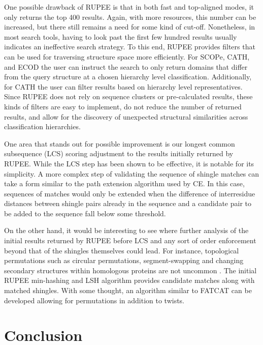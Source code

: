 \documentclass[10pt,letterpaper]{article}
\begin{document}
One possible drawback of RUPEE is that in both fast and top-aligned modes, it only returns the top 400 results. 
Again, with more resources, this number can be increased, but there still remains a need for some kind of cut-off. 
Nonetheless, in most search tools, having to look past the first few hundred results usually indicates an ineffective search strategy.
To this end, RUPEE provides filters that can be used for traversing structure space more efficiently. 
For SCOPe, CATH, and ECOD the user can instruct the search to only return domains that differ from the query structure at a chosen hierarchy level classification. 
Additionally, for CATH the user can filter results based on hierarchy level representatives. 
Since RUPEE does not rely on sequence clusters or pre-calculated results, these kinds of filters are easy to implement, do not reduce the number of returned results, and allow for the discovery of unexpected structural similarities across classification hierarchies.  

One area that stands out for possible improvement is our longest common subsequence (LCS) scoring adjustment to the results initially returned by RUPEE. 
While the LCS step has been shown to be effective, it is notable for its simplicity. 
A more complex step of validating the sequence of shingle matches can take a form similar to the path extension algorithm used by CE. 
In this case, sequences of matches would only be extended when the difference of interresidue distances between shingle pairs already in the sequence and a candidate pair to be added to the sequence fall below some threshold.

On the other hand, it would be interesting to see where further analysis of the initial results returned by RUPEE before LCS and any sort of order enforcement beyond that of the shingles themselves could lead. 
For instance, topological permutations such as circular permutations, segment-swapping and changing secondary structures within homologous proteins are not uncommon \cite{Andreeva2007}. 
The initial RUPEE min-hashing and LSH algorithm provides candidate matches along with matched shingles. 
With some thought, an algorithm similar to FATCAT can be developed allowing for permutations in addition to twists. 

\section*{Conclusion}
\end{document}
